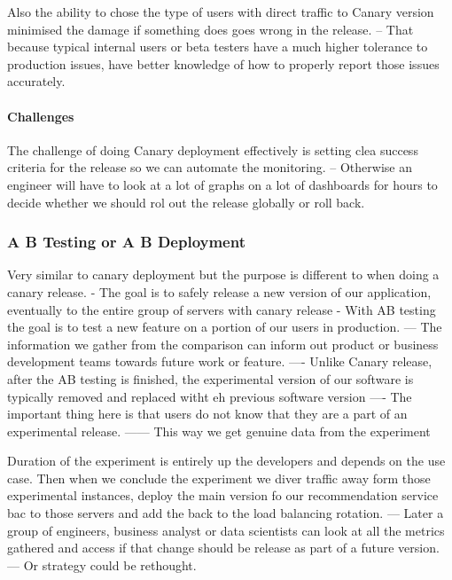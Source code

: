 \documentclass[a4paper, 11pt]{book}
\begin{document}
    Also the ability to chose the type of users with direct traffic to Canary version minimised the damage if something does goes wrong in the release.
    -- That because typical internal users or beta testers have a much higher tolerance to production issues, have better knowledge of how to properly report those issues accurately.

    \paragraph{Challenges}
    The challenge of doing Canary deployment effectively is setting clea success criteria for the release so we can automate the monitoring.
    -- Otherwise an engineer will have to look at a lot of graphs on a lot of dashboards for hours to decide whether we should rol out the release globally or roll back.

    \subsubsection{A B Testing or A B Deployment}
    Very similar to canary deployment but the purpose is different to when doing a canary release.
    - The goal is to safely release a new version of our application, eventually to the entire group of servers with canary release
    - With AB testing the goal is to test a new feature on a portion of our users in production.
    --- The information we gather from the comparison can inform out product or business development teams towards future work or feature.
    ---- Unlike Canary release, after the AB testing is finished, the experimental version of our software is typically removed and replaced witht eh previous software version
    ---- The important thing here is that users do not know that they are a part of an experimental release.
    ------ This way we get genuine data from the experiment

    Duration of the experiment is entirely up the developers and depends on the use case.
    Then when we conclude the experiment we diver traffic away form those experimental instances, deploy the main version fo our recommendation service bac to those servers and add the back to the load balancing rotation.
    --- Later a group of engineers, business analyst or data scientists can look at all the metrics gathered and access if that change should be release as part of a future version.
    --- Or strategy could be rethought.
\end{document}
